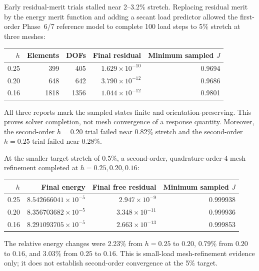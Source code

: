 Early residual-merit trials stalled near 2--3.2\% stretch. Replacing residual
merit by the energy merit function and adding a secant load predictor allowed
the first-order Phase~6/7 reference model to complete 100 load steps to
5\% stretch at three meshes:
\begin{center}
\begin{tabular}{@{}rrrrr@{}}
\toprule
\(h\) & Elements & DOFs & Final residual & Minimum sampled \(J\)\\
\midrule
0.25 & 399 & 405 & \(1.629\times10^{-10}\) & 0.9694\\
0.20 & 648 & 642 & \(3.790\times10^{-12}\) & 0.9686\\
0.16 & 1818 & 1356 & \(1.044\times10^{-12}\) & 0.9801\\
\bottomrule
\end{tabular}
\end{center}
All three reports mark the sampled states finite and orientation-preserving.
This proves solver completion, not mesh convergence of a response quantity.
Moreover, the second-order \(h=0.20\) trial failed near 0.82\% stretch and the
second-order \(h=0.25\) trial failed near 0.28\%.

At the smaller target stretch of 0.5\%, a second-order,
quadrature-order-4 mesh refinement completed at \(h=0.25,0.20,0.16\):
\begin{center}
\begin{tabular}{@{}rrrr@{}}
\toprule
\(h\) & Final energy & Final free residual & Minimum sampled \(J\)\\
\midrule
0.25 & \(8.542666041\times10^{-5}\) & \(2.947\times10^{-9}\) & 0.999938\\
0.20 & \(8.356703682\times10^{-5}\) & \(3.348\times10^{-11}\) & 0.999936\\
0.16 & \(8.291093705\times10^{-5}\) & \(2.663\times10^{-13}\) & 0.999853\\
\bottomrule
\end{tabular}
\end{center}
The relative energy changes were 2.23\% from \(h=0.25\) to \(0.20\), 0.79\%
from \(0.20\) to \(0.16\), and 3.03\% from \(0.25\) to \(0.16\). This is
small-load mesh-refinement evidence only; it does not establish second-order
convergence at the 5\% target.

